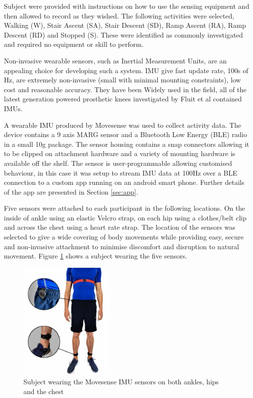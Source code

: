\documentclass[sensors,article,submit,moreauthors,pdftex]{Definitions/mdpi}
\begin{document}
Subject were provided with instructions on how to use the sensing equipment and then allowed to record as they wished. The following activities were selected, Walking (W), Stair Ascent (SA), Stair Descent (SD), Ramp Ascent (RA), Ramp Descent (RD) and Stopped (S). These were identified as commonly investigated and required no equipment or skill to perform\cite{Labarriere2020}.

Non-invasive wearable sensors, such as Inertial Measurement Units, are an appealing choice for developing such a system. IMU give fast update rate, 100s of Hz, are extremely non-invasive (small with minimal mounting constraints), low cost and reasonable accuracy. They have been Widely used in the field, all of the latest generation powered prosthetic knees investigated by Fluit et al contained IMUs\cite{Fluit2020}.

A wearable IMU produced by Movesense was used to collect activity data. The device contains a 9 axis MARG sensor and a Bluetooth Low Energy (BLE) radio in a small 10g package. The sensor housing contains a snap connectors allowing it to be clipped on attachment hardware and a variety of mounting hardware is available off the shelf. The sensor is user-programmable allowing customised behaviour, in this case it was setup to stream IMU data at 100Hz over a BLE connection to a custom app running on an android smart phone. Further details of the app are presented in Section \ref{sec:app}.

Five sensors were attached to each participant in the following locations. On the inside of ankle using an elastic Velcro strap, on each hip using a clothes/belt clip and across the chest using a heart rate strap. The location of the sensors was selected to give a wide covering of body movements while providing easy, secure and non-invasive attachment to minimise discomfort and disruption to natural movement. Figure \ref{fig:movesense_sensors} shows a subject wearing the five sensors.

\begin{figure}[!hbt]
    \centering
    \includegraphics[height=220px]{Figures/movesense/sensor_locations.jpg}
    \caption{Subject wearing the Movesense IMU sensors on both ankles, hips and the chest}
    \label{fig:movesense_sensors}
\end{figure}
\end{document}
